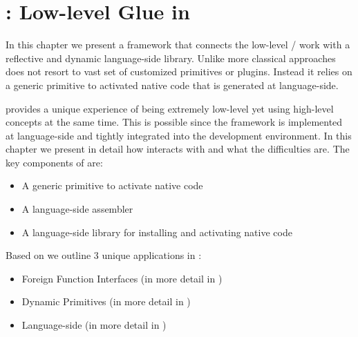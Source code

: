 
\chapter{\B: Low-level Glue in \PH}
\minitoc
\introduction

In this chapter we present \B a framework that connects the low-level / \VM work with a reflective and dynamic language-side library.
Unlike more classical approaches \B does not resort to vast set of customized \VM primitives or plugins.
Instead it relies on a generic primitive to activated native code that is generated at language-side.

\B provides a unique experience of being extremely low-level yet using high-level concepts at the same time.
This is possible since the framework is implemented at language-side and tightly integrated into the \PH development environment.
In this chapter we present in detail how \B interacts with \PH and what the difficulties are.
The key components of \B are:
\begin{itemize}[noitemsep]
\item A generic primitive to activate native code
\item \AsmJIT A language-side assembler
\item A language-side library for installing and activating native code
\end{itemize}

\noindent Based on \B we outline 3 unique applications in :
\begin{itemize}[noitemsep]
\item Foreign Function Interfaces (in more detail in )
\item Dynamic Primitives (in more detail in  )
\item Language-side \JIT (in more detail in  )
\end{itemize}


\newpage
